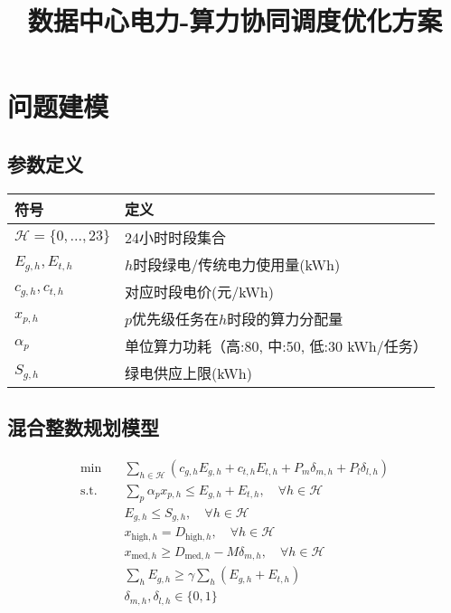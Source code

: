 \documentclass{article}
\title{数据中心电力-算力协同调度优化方案}
\author{}
\date{}
\begin{document}
\maketitle

\section{问题建模}
\subsection{参数定义}
\begin{tabularx}{\textwidth}{lX}
\toprule
符号 & 定义 \\
\midrule
$\mathcal{H}=\{0,...,23\}$ & 24小时时段集合 \\
$E_{g,h}, E_{t,h}$ & $h$时段绿电/传统电力使用量(kWh) \\
$c_{g,h}, c_{t,h}$ & 对应时段电价(元/kWh) \\
$x_{p,h}$ & $p$优先级任务在$h$时段的算力分配量 \\
$\alpha_p$ & 单位算力功耗（高:80, 中:50, 低:30 kWh/任务） \\
$S_{g,h}$ & 绿电供应上限(kWh) \\
\bottomrule
\end{tabularx}

\subsection{混合整数规划模型}
\begin{equation}
\begin{aligned}
\min \quad & \sum_{h\in\mathcal{H}} \left( c_{g,h}E_{g,h} + c_{t,h}E_{t,h} + P_m\delta_{m,h} + P_l\delta_{l,h} \right) \\
\text{s.t.} \quad & \sum_p \alpha_p x_{p,h} \leq E_{g,h} + E_{t,h}, \quad \forall h \in \mathcal{H} \\
& E_{g,h} \leq S_{g,h}, \quad \forall h \in \mathcal{H} \\
& x_{\text{high},h} = D_{\text{high},h}, \quad \forall h \in \mathcal{H} \\
& x_{\text{med},h} \geq D_{\text{med},h} - M\delta_{m,h}, \quad \forall h \in \mathcal{H} \\
& \sum_h E_{g,h} \geq \gamma \sum_h (E_{g,h}+E_{t,h}) \\
& \delta_{m,h}, \delta_{l,h} \in \{0,1\}
\end{aligned}
\end{equation}
\end{document}
